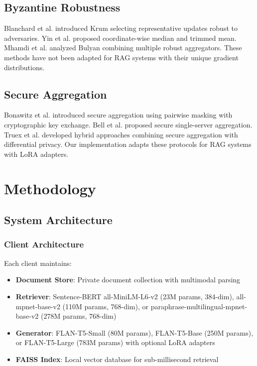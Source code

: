 \documentclass[conference]{IEEEtran}
\begin{document}
\subsection{Byzantine Robustness}

Blanchard et al. \cite{blanchard2017machine} introduced Krum selecting representative updates robust to adversaries. Yin et al. \cite{yin2018byzantine} proposed coordinate-wise median and trimmed mean. Mhamdi et al. \cite{mhamdi2018hidden} analyzed Bulyan combining multiple robust aggregators. These methods have not been adapted for RAG systems with their unique gradient distributions.

\subsection{Secure Aggregation}

Bonawitz et al. \cite{bonawitz2017practical} introduced secure aggregation using pairwise masking with cryptographic key exchange. Bell et al. \cite{bell2020secure} proposed secure single-server aggregation. Truex et al. \cite{truex2019hybrid} developed hybrid approaches combining secure aggregation with differential privacy. Our implementation adapts these protocols for RAG systems with LoRA adapters.

\section{Methodology}

\subsection{System Architecture}

\subsubsection{Client Architecture}
Each client maintains:
\begin{itemize}
    \item \textbf{Document Store}: Private document collection with multimodal parsing
    \item \textbf{Retriever}: Sentence-BERT all-MiniLM-L6-v2 (23M params, 384-dim), all-mpnet-base-v2 (110M params, 768-dim), or paraphrase-multilingual-mpnet-base-v2 (278M params, 768-dim)
    \item \textbf{Generator}: FLAN-T5-Small (80M params), FLAN-T5-Base (250M params), or FLAN-T5-Large (783M params) with optional LoRA adapters
    \item \textbf{FAISS Index}: Local vector database for sub-millisecond retrieval
\end{itemize}
\end{document}

